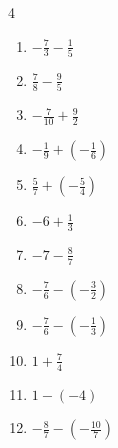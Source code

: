 \begin{multicols}{4}
\begin{enumerate}
  \item $\displaystyle -\frac{7}{3} - \frac{1}{5}$


\columnbreak %

  \item $\displaystyle \frac{7}{8} - \frac{9}{5}$


  \item $\displaystyle -\frac{7}{10} + \frac{9}{2}$


  \item $\displaystyle -\frac{1}{9} + \left(-\frac{1}{6}\right)$


  \item $\displaystyle \frac{5}{7} + \left(-\frac{5}{4}\right)$


  \item $\displaystyle -6 + \frac{1}{3}$


  \item $\displaystyle -7 - \frac{8}{7}$


  \item $\displaystyle -\frac{7}{6} - \left(-\frac{3}{2}\right)$


  \item $\displaystyle -\frac{7}{6} - \left(-\frac{1}{3}\right)$


  \item $\displaystyle 1 + \frac{7}{4}$


  \item $\displaystyle 1 - \left(-4\right)$

        \phantom{$\displaystyle =5$}

\columnbreak %

  \item $\displaystyle -\frac{8}{7} - \left(-\frac{10}{7}\right)$


\end{enumerate}
\end{multicols}
